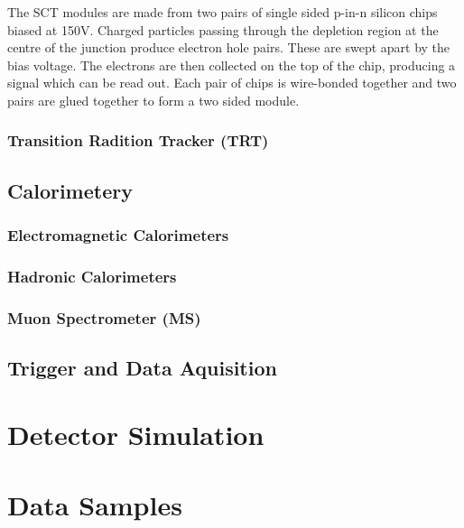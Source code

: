 The SCT modules are made from two pairs of single sided p-in-n silicon chips biased at 150V. Charged particles passing through the depletion region at the centre of the junction produce electron hole pairs. These are swept apart by the bias voltage. The electrons are then collected on the top of the chip, producing a signal which can be read out. Each pair of chips is wire-bonded together and two pairs are glued together to form a two sided module.

\subsubsection{Transition Radition Tracker (TRT)}
\subsection{Calorimetery}
\subsubsection{Electromagnetic Calorimeters}
\subsubsection{Hadronic Calorimeters}
\subsubsection{Muon Spectrometer (MS)}
\subsection{Trigger and Data Aquisition}
\section{Detector Simulation}
\section{Data Samples}
